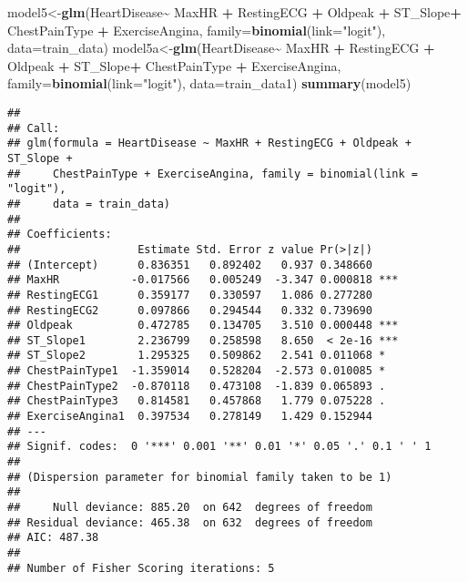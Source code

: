 \documentclass[
]{article}
\newenvironment{Shaded}{\begin{snugshade}}{\end{snugshade}}
\newcommand{\AttributeTok}[1]{\textcolor[rgb]{0.13,0.29,0.53}{#1}}
\newcommand{\FunctionTok}[1]{\textcolor[rgb]{0.13,0.29,0.53}{\textbf{#1}}}
\newcommand{\NormalTok}[1]{#1}
\newcommand{\OtherTok}[1]{\textcolor[rgb]{0.56,0.35,0.01}{#1}}
\newcommand{\SpecialCharTok}[1]{\textcolor[rgb]{0.81,0.36,0.00}{\textbf{#1}}}
\newcommand{\StringTok}[1]{\textcolor[rgb]{0.31,0.60,0.02}{#1}}
\begin{document}
\begin{Shaded}
\begin{Highlighting}[]
\NormalTok{model5}\OtherTok{\textless{}{-}}\FunctionTok{glm}\NormalTok{(HeartDisease}\SpecialCharTok{\textasciitilde{}}\NormalTok{  MaxHR }\SpecialCharTok{+}\NormalTok{ RestingECG }\SpecialCharTok{+}\NormalTok{ Oldpeak }\SpecialCharTok{+}\NormalTok{ ST\_Slope}\SpecialCharTok{+}
\NormalTok{              ChestPainType }\SpecialCharTok{+}\NormalTok{ ExerciseAngina, }\AttributeTok{family=}\FunctionTok{binomial}\NormalTok{(}\AttributeTok{link=}\StringTok{"logit"}\NormalTok{), }\AttributeTok{data=}\NormalTok{train\_data)}
\NormalTok{model5a}\OtherTok{\textless{}{-}}\FunctionTok{glm}\NormalTok{(HeartDisease}\SpecialCharTok{\textasciitilde{}}\NormalTok{ MaxHR }\SpecialCharTok{+}\NormalTok{ RestingECG }\SpecialCharTok{+}\NormalTok{ Oldpeak }\SpecialCharTok{+}\NormalTok{ ST\_Slope}\SpecialCharTok{+}
\NormalTok{              ChestPainType }\SpecialCharTok{+}\NormalTok{ ExerciseAngina, }\AttributeTok{family=}\FunctionTok{binomial}\NormalTok{(}\AttributeTok{link=}\StringTok{"logit"}\NormalTok{), }\AttributeTok{data=}\NormalTok{train\_data1)}
\FunctionTok{summary}\NormalTok{(model5)}
\end{Highlighting}
\end{Shaded}

\begin{verbatim}
## 
## Call:
## glm(formula = HeartDisease ~ MaxHR + RestingECG + Oldpeak + ST_Slope + 
##     ChestPainType + ExerciseAngina, family = binomial(link = "logit"), 
##     data = train_data)
## 
## Coefficients:
##                  Estimate Std. Error z value Pr(>|z|)    
## (Intercept)      0.836351   0.892402   0.937 0.348660    
## MaxHR           -0.017566   0.005249  -3.347 0.000818 ***
## RestingECG1      0.359177   0.330597   1.086 0.277280    
## RestingECG2      0.097866   0.294544   0.332 0.739690    
## Oldpeak          0.472785   0.134705   3.510 0.000448 ***
## ST_Slope1        2.236799   0.258598   8.650  < 2e-16 ***
## ST_Slope2        1.295325   0.509862   2.541 0.011068 *  
## ChestPainType1  -1.359014   0.528204  -2.573 0.010085 *  
## ChestPainType2  -0.870118   0.473108  -1.839 0.065893 .  
## ChestPainType3   0.814581   0.457868   1.779 0.075228 .  
## ExerciseAngina1  0.397534   0.278149   1.429 0.152944    
## ---
## Signif. codes:  0 '***' 0.001 '**' 0.01 '*' 0.05 '.' 0.1 ' ' 1
## 
## (Dispersion parameter for binomial family taken to be 1)
## 
##     Null deviance: 885.20  on 642  degrees of freedom
## Residual deviance: 465.38  on 632  degrees of freedom
## AIC: 487.38
## 
## Number of Fisher Scoring iterations: 5
\end{verbatim}
\end{document}
